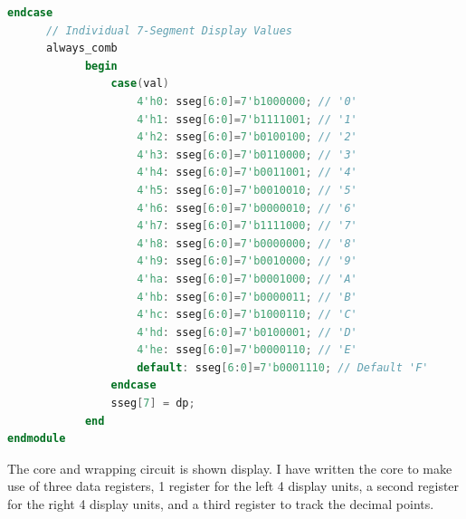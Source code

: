 \documentclass{article}
\begin{document}
\begin{lstlisting}[language = Verilog]
         endcase
      // Individual 7-Segment Display Values 
      always_comb
            begin
                case(val)
                    4'h0: sseg[6:0]=7'b1000000; // '0'
                    4'h1: sseg[6:0]=7'b1111001; // '1'
                    4'h2: sseg[6:0]=7'b0100100; // '2'
                    4'h3: sseg[6:0]=7'b0110000; // '3'
                    4'h4: sseg[6:0]=7'b0011001; // '4'
                    4'h5: sseg[6:0]=7'b0010010; // '5'
                    4'h6: sseg[6:0]=7'b0000010; // '6'
                    4'h7: sseg[6:0]=7'b1111000; // '7'
                    4'h8: sseg[6:0]=7'b0000000; // '8'
                    4'h9: sseg[6:0]=7'b0010000; // '9'
                    4'ha: sseg[6:0]=7'b0001000; // 'A' 
                    4'hb: sseg[6:0]=7'b0000011; // 'B' 
                    4'hc: sseg[6:0]=7'b1000110; // 'C' 
                    4'hd: sseg[6:0]=7'b0100001; // 'D' 
                    4'he: sseg[6:0]=7'b0000110; // 'E' 
                    default: sseg[6:0]=7'b0001110; // Default 'F'
                endcase
                sseg[7] = dp;
            end
endmodule

\end{lstlisting}

The core and wrapping circuit is shown display. I have written the core to make use of three data registers, 1 register for the left 4 display units, a second register for the right 4 display units, and a third register to track the decimal points. 
\end{document}
